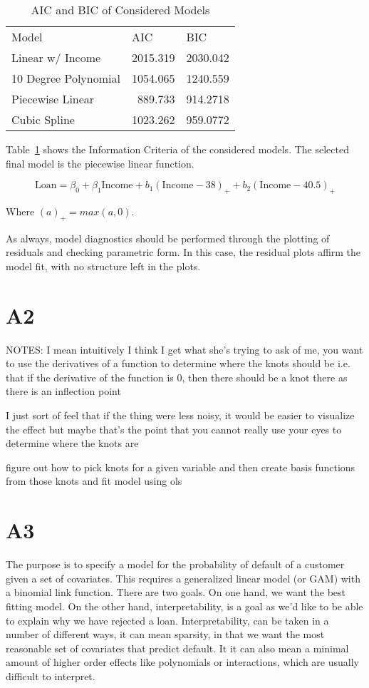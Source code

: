 \begin{table}[htbp]
  \centering
    \begin{tabular}{lrr}
    Model & \multicolumn{1}{l}{AIC} & \multicolumn{1}{l}{BIC} \\
    Linear w/ Income & 2015.319 & 2030.042 \\
    10 Degree Polynomial & 1054.065 & 1240.559 \\
    Piecewise Linear & 889.733 & 914.2718 \\
    Cubic Spline & 1023.262 & 959.0772 \\
    \end{tabular}%
  \caption{AIC and BIC of Considered Models}
  \label{a1_tab}%
\end{table}%


Table~\ref{a1_tab} shows the Information Criteria of the considered models. The selected final model is the piecewise linear function. 

$$\text{Loan} = \beta_0 + \beta_1\text{Income} + b_1(\text{Income} - 38)_+ + b_2(\text{Income} - 40.5)_+ $$

Where $(a)_+ = max(a, 0)$. 

As always, model diagnostics should be performed through the plotting of residuals and checking parametric form. In this case, the residual plots affirm the model fit, with no structure left in the plots. 


\section{A2}


NOTES:
I mean intuitively I think I get what she's trying to ask of me, you want to use the derivatives of a function to determine where the knots should be
i.e. that if the derivative of the function is 0, then there should be a knot there as there is an inflection point

I just sort of feel that if the thing were less noisy, it would be easier to visualize the effect
but maybe that's the point
that you cannot really use your eyes to determine where the knots are

figure out how to pick knots for a given variable
and then create basis functions from those knots
and fit model using ols


\section{A3}

The purpose is to specify a model for the probability of default of a customer given a set of covariates. This requires a generalized linear model (or GAM) with a binomial link function. There are two goals. On one hand, we want the best fitting model. On the other hand, interpretability, is a goal as we'd like to be able to explain why we have rejected a loan. Interpretability, can be taken in a number of different ways, it can mean sparsity, in that we want the most reasonable set of covariates that predict default. It it can also mean a minimal amount of higher order effects like polynomials or interactions, which are usually difficult to interpret. 

